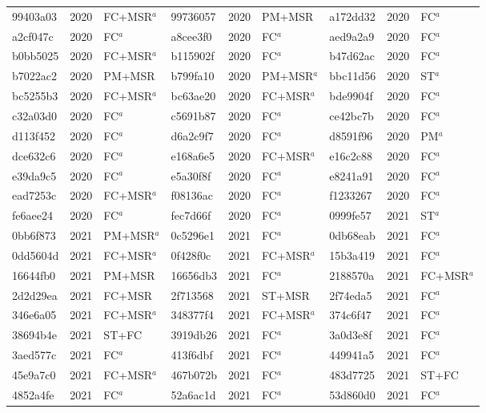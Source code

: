 \begin{longtable}{lll@{\hspace{10pt}}lll@{\hspace{10pt}}lll}
99403a03 & 2020 & FC+MSR$^{a}$ & 99736057 & 2020 & PM+MSR & a172dd32 & 2020 & FC$^{a}$ \\
a2cf047c & 2020 & FC$^{a}$ & a8cee3f0 & 2020 & FC$^{a}$ & aed9a2a9 & 2020 & FC$^{a}$ \\
b0bb5025 & 2020 & FC+MSR$^{a}$ & b115902f & 2020 & FC$^{a}$ & b47d62ac & 2020 & FC$^{a}$ \\
b7022ac2 & 2020 & PM+MSR & b799fa10 & 2020 & PM+MSR$^{a}$ & bbc11d56 & 2020 & ST$^{a}$ \\
bc5255b3 & 2020 & FC+MSR$^{a}$ & bc63ae20 & 2020 & FC+MSR$^{a}$ & bde9904f & 2020 & FC$^{a}$ \\
c32a03d0 & 2020 & FC$^{a}$ & c5691b87 & 2020 & FC$^{a}$ & ce42bc7b & 2020 & FC$^{a}$ \\
d113f452 & 2020 & FC$^{a}$ & d6a2c9f7 & 2020 & FC$^{a}$ & d8591f96 & 2020 & PM$^{a}$ \\
dce632c6 & 2020 & FC$^{a}$ & e168a6e5 & 2020 & FC+MSR$^{a}$ & e16c2c88 & 2020 & FC$^{a}$ \\
e39da9c5 & 2020 & FC$^{a}$ & e5a30f8f & 2020 & FC$^{a}$ & e8241a91 & 2020 & FC$^{a}$ \\
ead7253c & 2020 & FC+MSR$^{a}$ & f08136ac & 2020 & FC$^{a}$ & f1233267 & 2020 & FC$^{a}$ \\
fe6aee24 & 2020 & FC$^{a}$ & fec7d66f & 2020 & FC$^{a}$ & 0999fe57 & 2021 & ST$^{a}$ \\
0bb6f873 & 2021 & PM+MSR$^{a}$ & 0c5296e1 & 2021 & FC$^{a}$ & 0db68eab & 2021 & FC$^{a}$ \\
0dd5604d & 2021 & FC+MSR$^{a}$ & 0f428f0c & 2021 & FC+MSR$^{a}$ & 15b3a419 & 2021 & FC$^{a}$ \\
16644fb0 & 2021 & PM+MSR & 16656db3 & 2021 & FC$^{a}$ & 2188570a & 2021 & FC+MSR$^{a}$ \\
2d2d29ea & 2021 & FC+MSR & 2f713568 & 2021 & ST+MSR & 2f74eda5 & 2021 & FC$^{a}$ \\
346e6a05 & 2021 & FC+MSR$^{a}$ & 348377f4 & 2021 & FC+MSR$^{a}$ & 374c6f47 & 2021 & FC$^{a}$ \\
38694b4e & 2021 & ST+FC & 3919db26 & 2021 & FC$^{a}$ & 3a0d3e8f & 2021 & FC$^{a}$ \\
3aed577c & 2021 & FC$^{a}$ & 413f6dbf & 2021 & FC$^{a}$ & 449941a5 & 2021 & FC$^{a}$ \\
45e9a7c0 & 2021 & FC+MSR$^{a}$ & 467b072b & 2021 & FC$^{a}$ & 483d7725 & 2021 & ST+FC \\
4852a4fe & 2021 & FC$^{a}$ & 52a6ac1d & 2021 & FC$^{a}$ & 53d860d0 & 2021 & FC$^{a}$ \\

\end{longtable}
